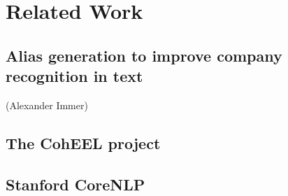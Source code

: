 \section{Related Work}
\subsection{Alias generation to improve company recognition in text}
(Alexander Immer)
\subsection{The CohEEL project}
\subsection{Stanford CoreNLP}